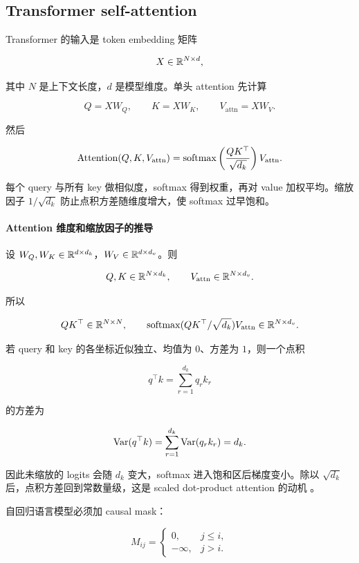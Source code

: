 \documentclass[11pt]{ctexart}
\begin{document}
\subsection{Transformer self-attention}


Transformer 的输入是 token embedding 矩阵

\[
  X\in\mathbb{R}^{N\times d},
\]

其中 \(N\) 是上下文长度，\(d\) 是模型维度。单头 attention 先计算

\[
  Q=XW_Q,
  \qquad
  K=XW_K,
  \qquad
  V_{\mathrm{attn}}=XW_V.
\]

然后

\[
  \operatorname{Attention}(Q,K,V_{\mathrm{attn}})
  =
  \operatorname{softmax}
  \left(
    \frac{QK^\top}{\sqrt{d_k}}
  \right)V_{\mathrm{attn}}.
\]

每个 query 与所有 key 做相似度，softmax 得到权重，再对 value 加权平均。缩放因子 \(1/\sqrt{d_k}\) 防止点积方差随维度增大，使 softmax 过早饱和。

\paragraph{Attention 维度和缩放因子的推导}

设 \(W_Q,W_K\in\mathbb{R}^{d\times d_k}\)，\(W_V\in\mathbb{R}^{d\times d_v}\)。则

\[
  Q,K\in\mathbb{R}^{N\times d_k},
  \qquad
  V_{\mathrm{attn}}\in\mathbb{R}^{N\times d_v}.
\]

所以

\[
  QK^\top\in\mathbb{R}^{N\times N},
  \qquad
  \operatorname{softmax}(QK^\top/\sqrt{d_k})V_{\mathrm{attn}}\in\mathbb{R}^{N\times d_v}.
\]

若 query 和 key 的各坐标近似独立、均值为 \(0\)、方差为 \(1\)，则一个点积

\[
  q^\top k=\sum_{r=1}^{d_k}q_r k_r
\]

的方差为

\[
  \operatorname{Var}(q^\top k)
  =
  \sum_{r=1}^{d_k}\operatorname{Var}(q_r k_r)
  =
  d_k.
\]

因此未缩放的 logits 会随 \(d_k\) 变大，softmax 进入饱和区后梯度变小。除以 \(\sqrt{d_k}\) 后，点积方差回到常数量级，这是 scaled dot-product attention 的动机 \parencite{vaswani2017attention,jurafsky2026slp}。

自回归语言模型必须加 causal mask：

\[
  M_{ij}
  =
  \begin{cases}
    0, & j\le i,\\
    -\infty, & j>i.
  \end{cases}
\]
\end{document}
